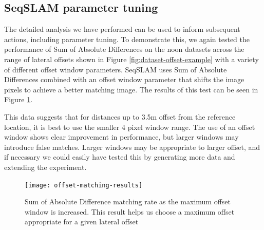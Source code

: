 \documentclass[letterpaper, 10 pt, conference]{ieeeconf}  %
\begin{document}
%
%

\subsection{SeqSLAM parameter tuning}

The detailed analysis we have performed can be used to inform subsequent actions, including parameter tuning. To demonstrate this, we again tested the performance of Sum of Absolute Differences on the noon datasets across the range of lateral offsets shown in Figure \ref{fig:dataset-offset-example} with a variety of different offset window parameters. SeqSLAM uses Sum of Absolute Differences combined with an offset window parameter that shifts the image pixels to achieve a better matching image. The results of this test can be seen in Figure \ref{fig:offset-matching-param-results}.

This data suggests that for distances up to 3.5m offset from the reference location, it is best to use the smaller 4 pixel window range. The use of an offset window shows clear improvement in performance, but larger windows may  introduce false matches. Larger windows may be appropriate to larger offset, and if necessary we could easily have tested this by generating more data and extending the experiment.

\begin{figure}[t]
    \texttt{[image: offset-matching-results]}
    \caption{Sum of Absolute Difference matching rate as the maximum offset window is increased. This result helps us choose a maximum offset appropriate for a given lateral offset}
    \label{fig:offset-matching-param-results}
\end{figure}
\end{document}
